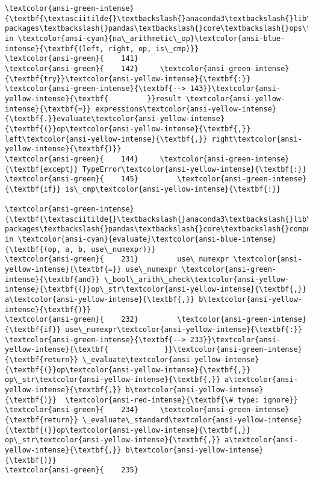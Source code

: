 \documentclass[11pt]{article}
\begin{document}
\begin{Verbatim}[commandchars=\\\{\}, frame=single, framerule=2mm, rulecolor=\color{outerrorbackground}]
\textcolor{ansi-green-intense}{\textbf{\textasciitilde{}\textbackslash{}anaconda3\textbackslash{}lib\textbackslash{}site-packages\textbackslash{}pandas\textbackslash{}core\textbackslash{}ops\textbackslash{}array\_ops.py}} in \textcolor{ansi-cyan}{na\_arithmetic\_op}\textcolor{ansi-blue-intense}{\textbf{(left, right, op, is\_cmp)}}
\textcolor{ansi-green}{    141} 
\textcolor{ansi-green}{    142}     \textcolor{ansi-green-intense}{\textbf{try}}\textcolor{ansi-yellow-intense}{\textbf{:}}
\textcolor{ansi-green-intense}{\textbf{--> 143}}\textcolor{ansi-yellow-intense}{\textbf{         }}result \textcolor{ansi-yellow-intense}{\textbf{=}} expressions\textcolor{ansi-yellow-intense}{\textbf{.}}evaluate\textcolor{ansi-yellow-intense}{\textbf{(}}op\textcolor{ansi-yellow-intense}{\textbf{,}} left\textcolor{ansi-yellow-intense}{\textbf{,}} right\textcolor{ansi-yellow-intense}{\textbf{)}}
\textcolor{ansi-green}{    144}     \textcolor{ansi-green-intense}{\textbf{except}} TypeError\textcolor{ansi-yellow-intense}{\textbf{:}}
\textcolor{ansi-green}{    145}         \textcolor{ansi-green-intense}{\textbf{if}} is\_cmp\textcolor{ansi-yellow-intense}{\textbf{:}}

\textcolor{ansi-green-intense}{\textbf{\textasciitilde{}\textbackslash{}anaconda3\textbackslash{}lib\textbackslash{}site-packages\textbackslash{}pandas\textbackslash{}core\textbackslash{}computation\textbackslash{}expressions.py}} in \textcolor{ansi-cyan}{evaluate}\textcolor{ansi-blue-intense}{\textbf{(op, a, b, use\_numexpr)}}
\textcolor{ansi-green}{    231}         use\_numexpr \textcolor{ansi-yellow-intense}{\textbf{=}} use\_numexpr \textcolor{ansi-green-intense}{\textbf{and}} \_bool\_arith\_check\textcolor{ansi-yellow-intense}{\textbf{(}}op\_str\textcolor{ansi-yellow-intense}{\textbf{,}} a\textcolor{ansi-yellow-intense}{\textbf{,}} b\textcolor{ansi-yellow-intense}{\textbf{)}}
\textcolor{ansi-green}{    232}         \textcolor{ansi-green-intense}{\textbf{if}} use\_numexpr\textcolor{ansi-yellow-intense}{\textbf{:}}
\textcolor{ansi-green-intense}{\textbf{--> 233}}\textcolor{ansi-yellow-intense}{\textbf{             }}\textcolor{ansi-green-intense}{\textbf{return}} \_evaluate\textcolor{ansi-yellow-intense}{\textbf{(}}op\textcolor{ansi-yellow-intense}{\textbf{,}} op\_str\textcolor{ansi-yellow-intense}{\textbf{,}} a\textcolor{ansi-yellow-intense}{\textbf{,}} b\textcolor{ansi-yellow-intense}{\textbf{)}}  \textcolor{ansi-red-intense}{\textbf{\# type: ignore}}
\textcolor{ansi-green}{    234}     \textcolor{ansi-green-intense}{\textbf{return}} \_evaluate\_standard\textcolor{ansi-yellow-intense}{\textbf{(}}op\textcolor{ansi-yellow-intense}{\textbf{,}} op\_str\textcolor{ansi-yellow-intense}{\textbf{,}} a\textcolor{ansi-yellow-intense}{\textbf{,}} b\textcolor{ansi-yellow-intense}{\textbf{)}}
\textcolor{ansi-green}{    235} 


\end{Verbatim}
\end{document}
